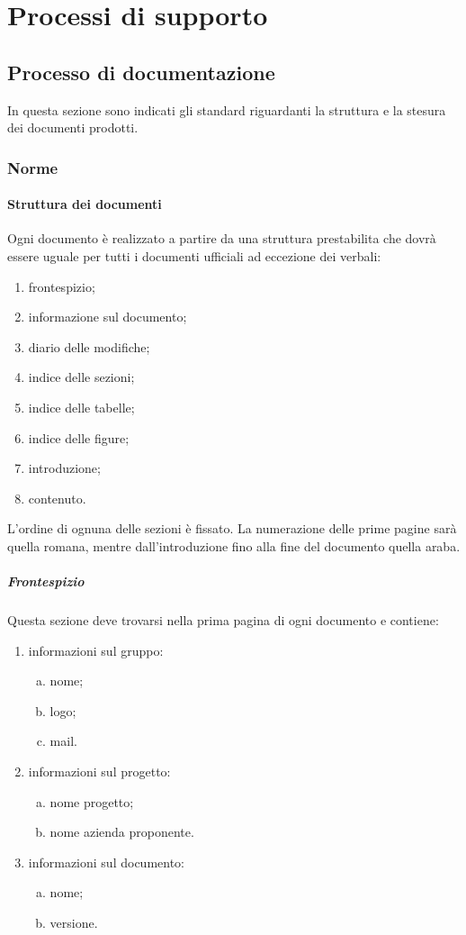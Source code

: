 \documentclass[../NormeProgetto.tex]{subfiles}
\begin{document}
\section{Processi di supporto}
\subsection{Processo di documentazione}
In questa sezione sono indicati gli standard riguardanti la struttura e la stesura dei documenti prodotti.
	\subsubsection{Norme}
	\paragraph{Struttura dei documenti}
	Ogni documento è realizzato a partire da una struttura prestabilita che dovrà essere uguale per tutti i documenti ufficiali ad eccezione dei verbali:
	\begin{enumerate}
		\item frontespizio;
		\item informazione sul documento;
		\item diario delle modifiche;
		\item indice delle sezioni;
		\item indice delle tabelle;
		\item indice delle figure;
		\item introduzione;
		\item contenuto.
	\end{enumerate}
	L'ordine di ognuna delle sezioni è fissato. La numerazione delle prime pagine sarà quella romana, mentre dall'introduzione fino alla fine del documento quella araba.

		\subparagraph{Frontespizio}
		Questa sezione deve trovarsi nella prima pagina di ogni documento e contiene:
		\begin{enumerate}
			\item informazioni sul gruppo:
				\begin{enumerate}[a.]
					\item nome;
					\item logo;
					\item mail.
				\end{enumerate}
			\item informazioni sul progetto:
				\begin{enumerate}[a.]
					\item nome progetto;
					\item nome azienda proponente.
				\end{enumerate}
			\item informazioni sul documento:
				\begin{enumerate}[a.]
					\item nome;
					\item versione.
				\end{enumerate}
		\end{enumerate}
\end{document}
